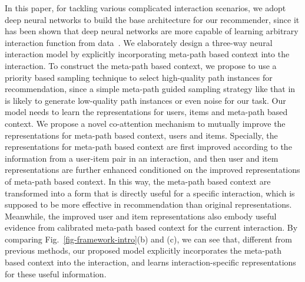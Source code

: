 In this paper, for tackling various complicated interaction scenarios,  we adopt deep neural networks to build the base architecture for our recommender, since it has been shown that deep neural networks are more capable of learning arbitrary interaction function from data~\cite{he2017neural}.
We elaborately design a three-way neural interaction model by explicitly incorporating meta-path based context into the interaction.
 To construct the meta-path based context, we propose to use a 
 priority based sampling technique to select high-quality path instances for recommendation, since a simple meta-path guided sampling strategy like that in \cite{dong2017metapath2vec} is likely to generate low-quality path instances or even noise for our task.  Our model needs to learn the representations for users, items and meta-path based context.
We propose a novel co-attention mechanism to mutually improve the representations for  meta-path based context, users and items. Specially, the  representations for meta-path based context are first improved according to the information from a user-item pair in an interaction, and then user and item representations are further enhanced conditioned on the improved representations of meta-path based context.
 In this way,  the  meta-path based context are transformed into a form that is directly useful for a specific interaction, which is supposed to be more effective in recommendation than original representations.
Meanwhile, the improved user and item representations also embody useful evidence from calibrated meta-path based context for the current interaction.
By comparing Fig.~\ref{fig-framework-intro}(b) and (c),
we can see that, different from previous methods, our proposed model explicitly incorporates the meta-path based context into the interaction, and learns interaction-specific representations for these useful information.

